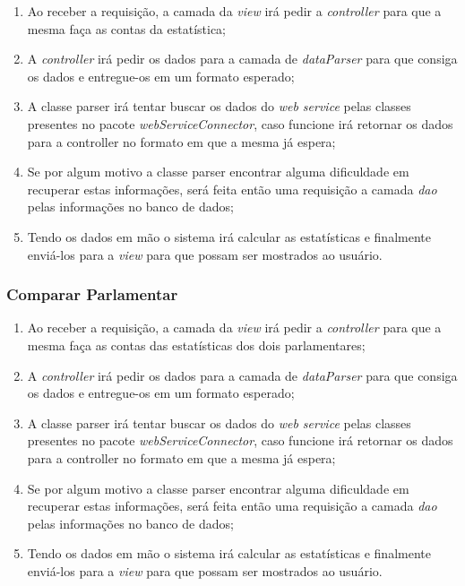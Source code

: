 		\begin{enumerate}
			\item Ao receber a requisição, a camada da \textit{view} irá pedir a \textit{controller} para que a mesma faça as contas da estatística;

			\item A \textit{controller} irá pedir os dados para a camada de \textit{dataParser} para que consiga os dados e entregue-os em um formato esperado;

			\item A classe parser irá tentar buscar os dados do \textit{web service} pelas classes presentes no pacote \textit{webServiceConnector}, caso funcione irá retornar os dados para a controller no formato em que a mesma já espera;

			\item Se por algum motivo a classe parser encontrar alguma dificuldade em recuperar estas informações, será feita então uma requisição a camada \textit{dao} pelas informações no banco de dados;

			\item Tendo os dados em mão o sistema irá calcular as estatísticas e finalmente enviá-los para a \textit{view} para que possam ser mostrados ao usuário.
		\end{enumerate}

	\subsubsection{Comparar Parlamentar}

		\begin{enumerate}
			\item Ao receber a requisição, a camada da \textit{view} irá pedir a \textit{controller} para que a mesma faça as contas das estatísticas dos dois parlamentares;

			\item A \textit{controller} irá pedir os dados para a camada de \textit{dataParser} para que consiga os dados e entregue-os em um formato esperado;

			\item A classe parser irá tentar buscar os dados do \textit{web service} pelas classes presentes no pacote \textit{webServiceConnector}, caso funcione irá retornar os dados para a controller no formato em que a mesma já espera;

			\item Se por algum motivo a classe parser encontrar alguma dificuldade em recuperar estas informações, será feita então uma requisição a camada \textit{dao} pelas informações no banco de dados;

			\item Tendo os dados em mão o sistema irá calcular as estatísticas e finalmente enviá-los para a \textit{view} para que possam ser mostrados ao usuário.
		\end{enumerate}